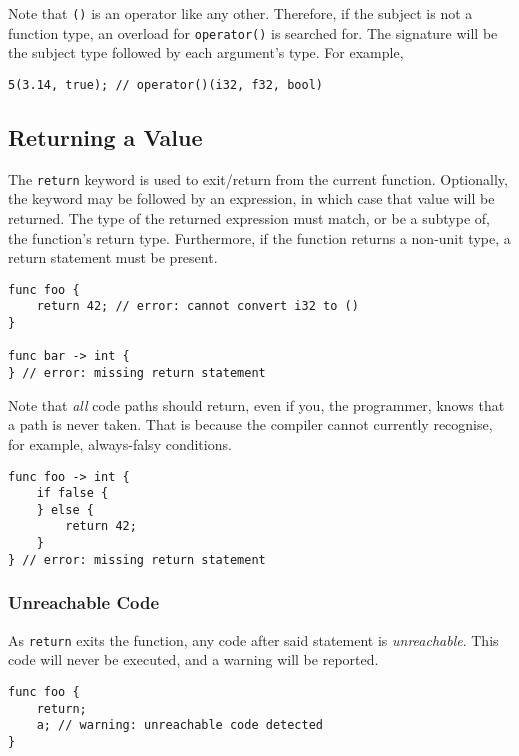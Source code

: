 Note that \texttt{()} is an operator like any other.
Therefore, if the subject is not a function type, an overload for \texttt{operator()} is searched for.
The signature will be the subject type followed by each argument's type.
For example,

\begin{lstlisting}[language=CustomLang]
5(3.14, true); // operator()(i32, f32, bool)
\end{lstlisting}

\subsection{Returning a Value}

The \texttt{return} keyword is used to exit/return from the current function.
Optionally, the keyword may be followed by an expression, in which case that value will be returned.
The type of the returned expression must match, or be a subtype of, the function's return type.
Furthermore, if the function returns a non-unit type, a return statement must be present.

\begin{lstlisting}[language=CustomLang]
func foo {
    return 42; // error: cannot convert i32 to ()
}

func bar -> int {
} // error: missing return statement
\end{lstlisting}

Note that \textit{all} code paths should return, even if you, the programmer, knows that a path is never taken.
That is because the compiler cannot currently recognise, for example, always-falsy conditions.

\begin{lstlisting}[language=CustomLang]
func foo -> int {
    if false {
    } else {
        return 42;
    }
} // error: missing return statement
\end{lstlisting}

\subsubsection{Unreachable Code}

As \texttt{return} exits the function, any code after said statement is \textit{unreachable}.
This code will never be executed, and a warning will be reported.

\begin{lstlisting}[language=CustomLang]
func foo {
    return;
    a; // warning: unreachable code detected
}
\end{lstlisting}

